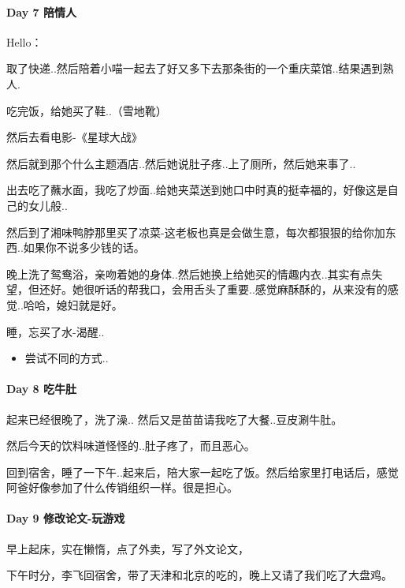 \documentclass[UTF8,a4paper,8pt]{ctexart}
\begin{document}
	 \paragraph{Day 7   陪情人   \quad     }Hello：
	 
		 取了快递..然后陪着小喵一起去了好又多下去那条街的一个重庆菜馆..结果遇到熟人.
		 
		 吃完饭，给她买了鞋..（雪地靴）
		 
		 然后去看电影-《星球大战》
		 
		 然后就到那个什么主题酒店..然后她说肚子疼..上了厕所，然后她来事了..
		 
		 出去吃了蘸水面，我吃了炒面..给她夹菜送到她口中时真的挺幸福的，好像这是自己的女儿般..
		 
		 然后到了湘味鸭脖那里买了凉菜-这老板也真是会做生意，每次都狠狠的给你加东西..如果你不说多少钱的话。
		 
		 晚上洗了鸳鸯浴，亲吻着她的身体..然后她换上给她买的情趣内衣..其实有点失望，但还好。她很听话的帮我口，会用舌头了重要..感觉麻酥酥的，从来没有的感觉..哈哈，媳妇就是好。
		 
		 睡，忘买了水-渴醒..
		 \begin{itemize}
		 	\item  \makebox[0pt][l]{$\square$}\raisebox{.15ex}{\hspace{0.1em}$\checkmark$}尝试不同的方式..
		 \end{itemize}
	 \paragraph{Day 8   吃牛肚    \quad     }
		 起来已经很晚了，洗了澡.. 然后又是苗苗请我吃了大餐..豆皮涮牛肚。
		 
		 然后今天的饮料味道怪怪的..肚子疼了，而且恶心。
		 
		 回到宿舍，睡了一下午..起来后，陪大家一起吃了饭。然后给家里打电话后，感觉阿爸好像参加了什么传销组织一样。很是担心。
	 \paragraph{Day 9   修改论文-玩游戏   \quad     }
		 
		 早上起床，实在懒惰，点了外卖，写了外文论文，
		 
		 下午时分，李飞回宿舍，带了天津和北京的吃的，晚上又请了我们吃了大盘鸡。
		 
\end{document}
